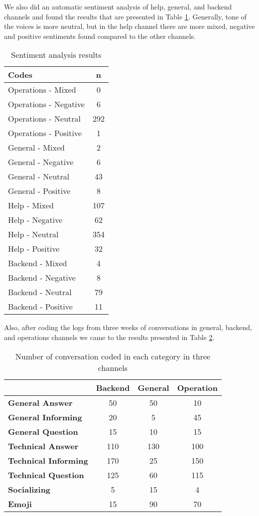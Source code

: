  We also did an automatic sentiment analysis of help, general, and backend channels and found the results that are presented in Table \ref{table:sentiment}. Generally, tone of the voices is more neutral, but in the help channel there are more mixed, negative and positive sentiments found compared to the other channels.
 
\begin{table}
\centering
\caption{Sentiment analysis results} \label{table:sentiment}
\begin{tabular}{lc}
\hline
\textbf{Codes} & \textbf{n} \\ \hline
Operations - Mixed&0\\
Operations - Negative&6\\
Operations - Neutral&292\\
Operations - Positive&1\\ \hline
General - Mixed&2 \\
General - Negative&6 \\
General - Neutral&43 \\
General - Positive&8 \\ \hline
Help - Mixed&107\\
Help - Negative&62\\
Help - Neutral&354\\
Help - Positive&32 \\ \hline
Backend - Mixed&4\\
Backend - Negative&8\\
Backend - Neutral&79\\
Backend - Positive&11\\
\hline
\end{tabular}
\end{table}

Also, after coding the logs from three weeks of conversations in general, backend, and operations channels we came to the results presented in Table \ref{table:coded}.

\begin{table}
\centering
\caption{Number of conversation coded in each category in three channels} \label{table:coded}
\begin{tabular}{lccc}
\hline
 & \textbf{Backend} & \textbf{General} & \textbf{Operation} \\ \hline
\textbf{General Answer}&50 &50 &10 \\
\textbf{General Informing}&20 &5 &45 \\
\textbf{General Question}&15 &10 &15 \\
\textbf{Technical Answer}&110 &130 &100 \\
\textbf{Technical Informing}&170 &25 & 150\\
\textbf{Technical Question}&125 &60 &115 \\
\textbf{Socializing}&5 &15 &4 \\
\textbf{Emoji}&15 &90 &70 \\
\hline
\end{tabular}
\end{table}

